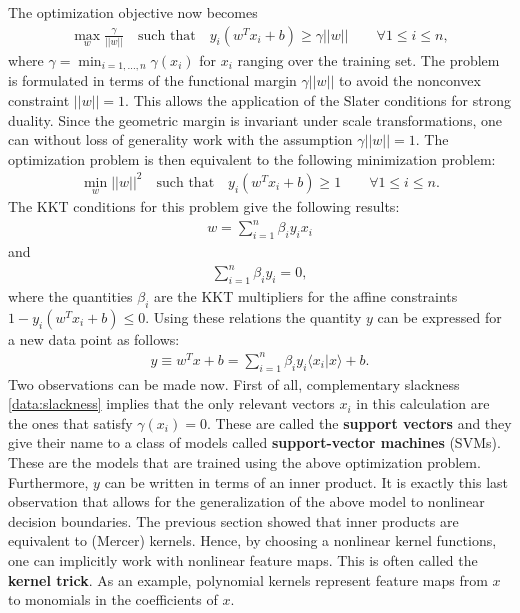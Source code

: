     The optimization objective now becomes
    \begin{gather}
        \max_w \frac{\gamma}{||w||}\quad\text{such that}\quad y_i(w^Tx_i+b)\geq\gamma||w||\qquad\forall 1\leq i\leq n,
    \end{gather}
    where $\gamma=\min_{i=1,\ldots,n}\gamma(x_i)$ for $x_i$ ranging over the training set. The problem is formulated in terms of the functional margin $\gamma||w||$ to avoid the nonconvex constraint $||w||=1$. This allows the application of the Slater conditions for strong duality. Since the geometric margin is invariant under scale transformations, one can without loss of generality work with the assumption $\gamma||w||=1$. The optimization problem is then equivalent to the following minimization problem:
    \begin{gather}
        \min_w ||w||^2\quad\text{such that}\quad y_i(w^Tx_i+b)\geq1\qquad\forall 1\leq i\leq n.
    \end{gather}
    The KKT conditions for this problem give the following results:
    \begin{gather}
        w = \sum_{i=1}^n\beta_iy_ix_i
    \end{gather}
    and
    \begin{gather}
        \sum_{i=1}^n\beta_iy_i = 0,
    \end{gather}
    where the quantities $\beta_i$ are the KKT multipliers for the affine constraints $1-y_i(w^Tx_i+b)\leq0$. Using these relations the quantity $y$ can be expressed for a new data point as follows:
    \begin{gather}
        y \equiv w^Tx + b = \sum_{i=1}^n\beta_iy_i\langle x_i|x \rangle + b.
    \end{gather}
    Two observations can be made now. First of all, complementary slackness \ref{data:slackness} implies that the only relevant vectors $x_i$ in this calculation are the ones that satisfy $\gamma(x_i)=0$. These are called the \textbf{support vectors} and they give their name to a class of models called \textbf{support-vector machines} (SVMs). These are the models that are trained using the above optimization problem. Furthermore, $y$ can be written in terms of an inner product. It is exactly this last observation that allows for the generalization of the above model to nonlinear decision boundaries. The previous section showed that inner products are equivalent to (Mercer) kernels. Hence, by choosing a nonlinear kernel functions, one can implicitly work with nonlinear feature maps. This is often called the \textbf{kernel trick}. As an example, polynomial kernels represent feature maps from $x$ to monomials in the coefficients of $x$.


